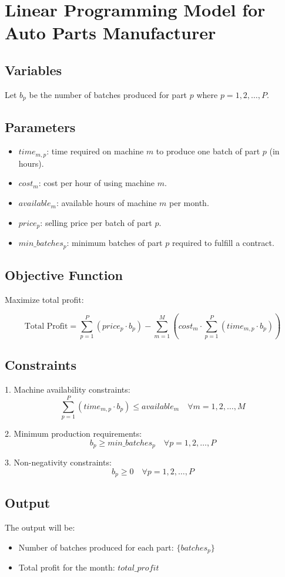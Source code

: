 \documentclass{article}
\begin{document}
\section*{Linear Programming Model for Auto Parts Manufacturer}

\subsection*{Variables}
Let \( b_p \) be the number of batches produced for part \( p \) where \( p = 1, 2, \ldots, P \).

\subsection*{Parameters}
\begin{itemize}
    \item \( time_{m,p} \): time required on machine \( m \) to produce one batch of part \( p \) (in hours).
    \item \( cost_m \): cost per hour of using machine \( m \).
    \item \( available_m \): available hours of machine \( m \) per month.
    \item \( price_p \): selling price per batch of part \( p \).
    \item \( min\_batches_p \): minimum batches of part \( p \) required to fulfill a contract.
\end{itemize}

\subsection*{Objective Function}
Maximize total profit:

\[
\text{Total Profit} = \sum_{p=1}^{P} (price_p \cdot b_p) - \sum_{m=1}^{M} \left( cost_m \cdot \sum_{p=1}^{P} (time_{m,p} \cdot b_p) \right)
\]

\subsection*{Constraints}

1. Machine availability constraints:
\[
\sum_{p=1}^{P} (time_{m,p} \cdot b_p) \leq available_m \quad \forall m = 1, 2, \ldots, M
\]

2. Minimum production requirements:
\[
b_p \geq min\_batches_p \quad \forall p = 1, 2, \ldots, P
\]

3. Non-negativity constraints:
\[
b_p \geq 0 \quad \forall p = 1, 2, \ldots, P
\]

\subsection*{Output}
The output will be:
\begin{itemize}
    \item Number of batches produced for each part: \( \{batches_p\} \)
    \item Total profit for the month: \( total\_profit \)
\end{itemize}
\end{document}
